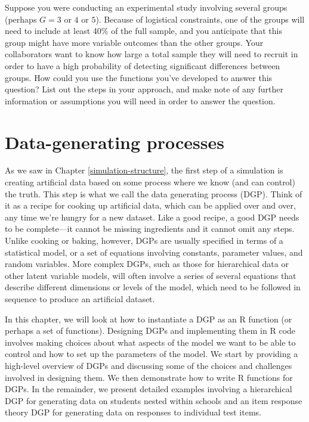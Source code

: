 \documentclass[
]{book}
\begin{document}
Suppose you were conducting an experimental study involving several groups (perhaps \(G = 3\) or \(4\) or \(5\)). Because of logistical constraints, one of the groups will need to include at least 40\% of the full sample, and you anticipate that this group might have more variable outcomes than the other groups. Your collaborators want to know how large a total sample they will need to recruit in order to have a high probability of detecting significant differences between groups.
How could you use the functions you've developed to answer this question? List out the steps in your approach, and make note of any further information or assumptions you will need in order to answer the question.

\chapter{Data-generating processes}\label{data-generating-processes}

As we saw in Chapter \ref{simulation-structure}, the first step of a simulation is creating artificial data based on some process where we know (and can control) the truth.
This step is what we call the data generating process (DGP).
Think of it as a recipe for cooking up artificial data, which can be applied over and over, any time we're hungry for a new dataset.
Like a good recipe, a good DGP needs to be complete---it cannot be missing ingredients and it cannot omit any steps.
Unlike cooking or baking, however, DGPs are usually specified in terms of a statistical model, or a set of equations involving constants, parameter values, and random variables.
More complex DGPs, such as those for hierarchical data or other latent variable models, will often involve a series of several equations that describe different dimensions or levels of the model, which need to be followed in sequence to produce an artificial dataset.

In this chapter, we will look at how to instantiate a DGP as an R function (or perhaps a set of functions).
Designing DGPs and implementing them in R code involves making choices about what aspects of the model we want to be able to control and how to set up the parameters of the model.
We start by providing a high-level overview of DGPs and discussing some of the choices and challenges involved in designing them.
We then demonstrate how to write R functions for DGPs.
In the remainder, we present detailed examples involving a hierarchical DGP for generating data on students nested within schools and an item response theory DGP for generating data on responses to individual test items.
\end{document}
